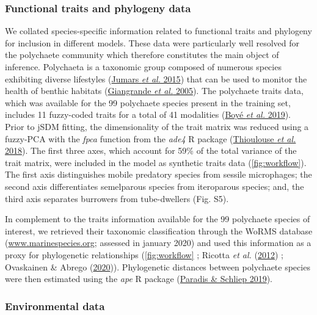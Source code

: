 \documentclass[9pt,biorxiv,doublespacing,lineno]{lapreprint}
\begin{document}
\hypertarget{functional-traits-and-phylogeny-data}{%
\subsubsection{Functional traits and phylogeny
data}\label{functional-traits-and-phylogeny-data}}

We collated species-specific information related to functional traits
and phylogeny for inclusion in different models. These data were
particularly well resolved for the polychaete community which therefore
constitutes the main object of inference. Polychaeta is a taxonomic
group composed of numerous species exhibiting diverse lifestyles
(\protect\hyperlink{ref-Jumars_2015}{Jumars \emph{et al.} 2015}) that
can be used to monitor the health of benthic habitats
(\protect\hyperlink{ref-Giangrande_2005}{Giangrande \emph{et al.}
2005}). The polychaete traits data, which was available for the 99
polychaete species present in the training set, includes 11 fuzzy-coded
traits for a total of 41 modalities
(\protect\hyperlink{ref-Boye_2019a}{Boyé \emph{et al.} 2019}). Prior to
jSDM fitting, the dimensionality of the trait matrix was reduced using a
fuzzy-PCA with the \emph{fpca} function from the \emph{ade4} R package
(\protect\hyperlink{ref-Thioulouse_2018}{Thioulouse \emph{et al.}
2018}). The first three axes, which account for 59\% of the total
variance of the trait matrix, were included in the model as synthetic
traits data (\cref{fig:workflow}). The first axis distinguishes mobile
predatory species from sessile microphages; the second axis
differentiates semelparous species from iteroparous species; and, the
third axis separates burrowers from tube-dwellers (Fig. S5).

In complement to the traits information available for the 99 polychaete
species of interest, we retrieved their taxonomic classification through
the WoRMS database
(\href{https://www.marinespecies.org}{www.marinespecies.org}; assessed
in january 2020) and used this information as a proxy for phylogenetic
relationships (\cref{fig:workflow} ; Ricotta \emph{et al.}
(\protect\hyperlink{ref-Ricotta_2012}{2012}) ; Ovaskainen \& Abrego
(\protect\hyperlink{ref-Ovaskainen_2020}{2020})). Phylogenetic distances
between polychaete species were then estimated using the \emph{ape} R
package (\protect\hyperlink{ref-Paradis_2019}{Paradis \& Schliep 2019}).

\hypertarget{environmental-data}{%
\subsubsection{Environmental data}\label{environmental-data}}
\end{document}
